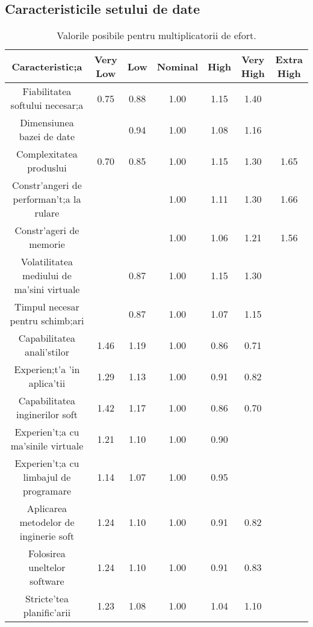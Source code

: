 \subsection{Caracteristicile setului de date}
\par
\begin{table}[!htbp]
\begin{center}
\begin{tabular}{| c | c | c | c | c | c | c |}
\hline
Caracteristic;a & Very Low & Low & Nominal & High & Very High & Extra High \\ \hline \hline
Fiabilitatea softului necesar;a & 0.75 & 0.88 & 1.00 & 1.15 & 1.40 & \\ \hline
Dimensiunea bazei de date &  & 0.94 & 1.00 & 1.08 & 1.16 & \\ \hline
Complexitatea produslui & 0.70 & 0.85 & 1.00 & 1.15 & 1.30 & 1.65 \\ \hline
Constr'angeri de performan't;a la rulare & & & 1.00 & 1.11 & 1.30 & 1.66 \\ \hline
Constr'ageri de memorie & & & 1.00 & 1.06 & 1.21 & 1.56 \\ \hline
Volatilitatea mediului de ma'sini virtuale & & 0.87 & 1.00 & 1.15 & 1.30 & \\ \hline
Timpul necesar pentru schimb;ari & & 0.87 & 1.00 & 1.07 & 1.15 & \\ \hline
Capabilitatea anali'stilor & 1.46 & 1.19 & 1.00 & 0.86 & 0.71 & \\ \hline
Experien;t'a 'in aplica'tii & 1.29 & 1.13 & 1.00 & 0.91 & 0.82 & \\ \hline
Capabilitatea inginerilor soft & 1.42 & 1.17 & 1.00 & 0.86 & 0.70 & \\ \hline
Experien't;a cu ma'sinile virtuale & 1.21 & 1.10 & 1.00 & 0.90 & & \\ \hline
Experien't;a cu limbajul de programare & 1.14 & 1.07 & 1.00 & 0.95 & & \\ \hline
Aplicarea metodelor de inginerie soft & 1.24 & 1.10 & 1.00 & 0.91 & 0.82 & \\ \hline
Folosirea uneltelor software & 1.24 & 1.10 & 1.00 & 0.91 & 0.83 & \\ \hline
Stricte'tea planific'arii & 1.23 & 1.08 & 1.00 & 1.04 & 1.10 & \\ \hline
\end{tabular}
\caption{Valorile posibile pentru multiplicatorii de efort.}
\end{center}
\end{table}
\par

